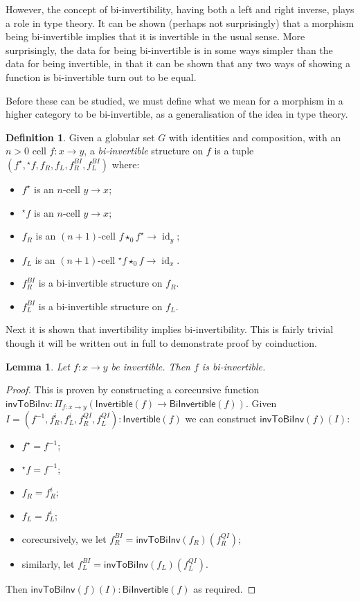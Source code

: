 \documentclass{article}
\newtheorem{lemma}[theorem]{Lemma} \theoremstyle{definition}
\newtheorem{definition}[theorem]{Definition} \theoremstyle{remark}
\DeclareMathOperator{\id}{id}
\newcommand{\linv}[1]{{}^\star\!#1} \newcommand{\rinv}[1]{#1^\star}
\newcommand{\inv}[1]{#1^{-1}} \newcommand{\comp}{\star}
\begin{document}
However, the concept of bi-invertibility, having both a left and right
inverse, plays a role in type theory. It can be shown (perhaps not
surprisingly) that a morphism being bi-invertible implies that it is
invertible in the usual sense. More surprisingly, the data for being
bi-invertible is in some ways simpler than the data for being
invertible, in that it can be shown that any two ways of showing a
function is bi-invertible turn out to be equal.

Before these can be studied, we must define what we mean for a
morphism in a higher category to be bi-invertible, as a generalisation
of the idea in type theory.

\begin{definition}
  Given a globular set \(G\) with identities and composition, with an
  \(n > 0\) cell \(f : x \to y\), a \emph{bi-invertible} structure on
  \(f\) is a tuple \((\rinv f, \linv f, f_R, f_L, f_R^{BI}, f_L^{BI})\)
  where:
  \begin{itemize}
  \item \(\rinv f\) is an \(n\)-cell \(y \to x\);
  \item \(\linv f\) is an \(n\)-cell \(y \to x\);
  \item \(f_R\) is an \((n+1)\)-cell \(f \comp_0 \rinv f \to \id_y\);
  \item \(f_L\) is an \((n+1)\)-cell \(\linv f \comp_0 f \to \id_x\).
  \item \(f_R^{BI}\) is a bi-invertible structure on \(f_R\).
  \item \(f_L^{BI}\) is a bi-invertible structure on \(f_L\).
  \end{itemize}
\end{definition}

Next it is shown that invertibility implies bi-invertibility. This is
fairly trivial though it will be written out in full to demonstrate proof by
coinduction.

\begin{lemma}\label{inv-to-bi-inv}
  Let \(f : x \to y\) be invertible. Then \(f\) is bi-invertible.
\end{lemma}

\begin{proof}
  This is proven by constructing a corecursive function
  \(\mathsf{invToBiInv} : \Pi_{f : x \to y} (\mathsf{Invertible}(f)
  \to \mathsf{BiInvertible}(f))\). Given \(I = (\inv
  f,f_R^i,f_L^i,f_R^{QI}, f_L^{QI}) : \mathsf{Invertible}(f)\) we can
  construct \(\mathsf{invToBiInv}(f)(I)\):
  \begin{itemize}
  \item \(\rinv f = \inv f\);
  \item \(\linv f = \inv f\);
  \item \(f_R = f_R^i\);
  \item \(f_L = f_L^i\);
  \item corecursively, we let \(f_R^{BI} =
    \mathsf{invToBiInv}(f_R)(f_R^{QI})\);
  \item similarly, let \(f_L^{BI} =
    \mathsf{invToBiInv}(f_L)(f_L^{QI})\).
  \end{itemize}
  Then \(\mathsf{invToBiInv}(f)(I) : \mathsf{BiInvertible}(f)\) as
  required.
\end{proof}
\end{document}
